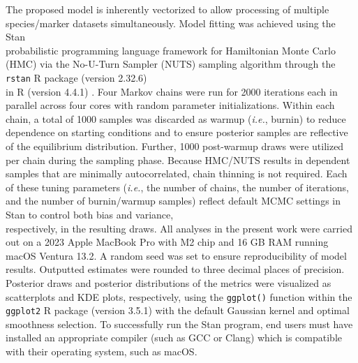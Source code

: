 \documentclass[12pt]{article}
\begin{document}
The proposed model is inherently vectorized to allow processing of multiple \\ species/marker datasets simultaneously. Model fitting was achieved using the Stan \\ probabilistic programming language \citep{carpenter2017stan} framework for Hamiltonian Monte Carlo (HMC) \citep{neal2011mcmc} via the No-U-Turn Sampler (NUTS) sampling algorithm \citep{hoffman2014no} through the {\tt rstan} R package (version 2.32.6) \\ \citep{stan2023rstan} in R (version 4.4.1) \citep{rcore2024language}. Four Markov chains were run for 2000 iterations each in parallel across four cores with random parameter initializations. Within each chain, a total of 1000 samples was discarded as warmup (\textit{i.e.}, burnin) to reduce dependence on starting conditions and to ensure posterior samples are reflective of the equilibrium distribution. Further, 1000 post-warmup draws were utilized per chain during the sampling phase. Because HMC/NUTS results in dependent samples that are minimally autocorrelated, chain thinning is not required. Each of these tuning parameters (\textit{i.e.}, the number of chains, the number of iterations, and the number of burnin/warmup samples) reflect default MCMC settings in Stan to control both bias and variance, \\ respectively, in the resulting draws. All analyses in the present work were carried out on a 2023 Apple MacBook Pro with M2 chip and 16 GB RAM running macOS Ventura 13.2. A random seed was set to ensure reproducibility of model results. Outputted estimates were rounded to three decimal places of precision. Posterior draws and posterior distributions of the metrics were visualized as scatterplots and KDE plots, respectively, using the {\tt ggplot()} function within the {\tt ggplot2} R package (version 3.5.1) \citep{wickham2016ggplot2} with the default Gaussian kernel and optimal smoothness selection. To successfully run the Stan program, end users must have installed an appropriate compiler (such as GCC or Clang) which is compatible with their operating system, such as macOS.
\end{document}
